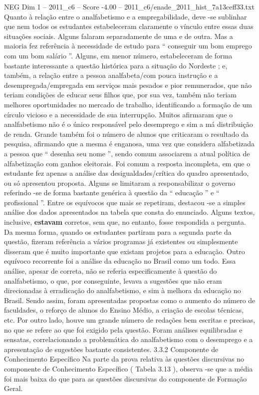\begin{textsample}{NEG Dim 1 – 2011\_c6 – Score -4.00 – 2011\_c6/enade\_2011\_hist\_7a13ceff33.txt}
Quanto à relação entre o analfabetismo e a empregabilidade, deve -se sublinhar que nem todos os estudantes estabeleceram claramente o vínculo entre essas duas situações sociais.
Alguns falaram separadamente de uma e de outra.
Mas a maioria fez referência à necessidade de estudo para “ conseguir um bom emprego com um bom salário ”.
Alguns, em menor número, estabeleceram de forma bastante interessante a questão histórica para a situação do Nordeste ; e, também, a relação entre a pessoa analfabeta/com pouca instrução e a desempregada/empregada em serviços mais pesados e pior remunerados, que não teriam condições de educar seus filhos que, por sua vez, também não teriam melhores oportunidades no mercado de trabalho, identificando a formação de um círculo vicioso e a necessidade de sua interrupção.
Muitos afirmaram que o analfabetismo não é o único responsável pelo desemprego e sim a má distribuição de renda.
Grande também foi o número de alunos que criticaram o resultado da pesquisa, afirmando que a mesma é enganosa, uma vez que considera alfabetizada a pessoa que “ desenha seu nome ”, sendo comum associarem a atual política de alfabetização com ganhos eleitorais.
Foi comum a resposta incompleta, em que o estudante fez apenas a análise das desigualdades/crítica do quadro apresentado, ou só apresentou proposta.
Alguns se limitaram a responsabilizar o governo referindo -se de forma bastante genérica à questão da “ educação ” e “ profissional ”.
Entre os equívocos que mais se repetiram, destacou -se a simples análise dos dados apresentados na tabela que consta do enunciado.
Alguns textos, inclusive, \textbf{estavam} corretos, sem que, no entanto, fosse respondida a pergunta.
Da mesma forma, quando os estudantes partiram para a segunda parte da questão, fizeram referência a vários programas já existentes ou simplesmente disseram que é muito importante que existam projetos para a educação.
Outro equívoco recorrente foi a análise da educação no Brasil como um todo.
Essa análise, apesar de correta, não se referia especificamente à questão do analfabetismo, o que, por conseguinte, levava a sugestões que não eram direcionadas à erradicação do analfabetismo, e sim à melhora da educação no Brasil.
Sendo assim, foram apresentadas propostas como o aumento do número de faculdades, o reforço de alunos do Ensino Médio, a criação de escolas técnicas, etc.
Por outro lado, houve um grande número de redações bem escritas e precisas, no que se refere ao que foi exigido pela questão.
Foram análises equilibradas e sensatas, correlacionando a problemática do analfabetismo com o desemprego e a apresentação de sugestões bastante consistentes. 3.3.2 Componente de Conhecimento Específico Na parte da prova relativa às questões discursivas no componente de Conhecimento Específico ( Tabela 3.13 ), observa -se que a média foi mais baixa do que para as questões discursivas do componente de Formação Geral.

\end{textsample}
